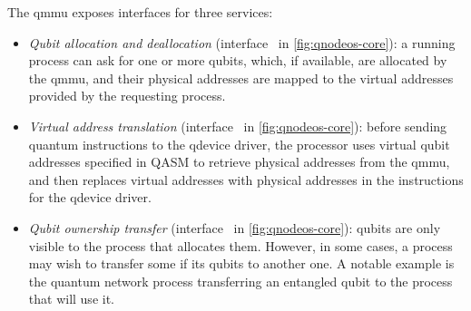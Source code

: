 The \acrshort{qmmu} exposes interfaces for three services:
\begin{itemize}
    \item \emph{Qubit allocation and deallocation} (interface~ in
          \cref{fig:qnodeos-core}): a running process can ask for one or more qubits, which, if
          available, are allocated by the \acrshort{qmmu}, and their physical addresses are mapped
          to the virtual addresses provided by the requesting process.
    \item \emph{Virtual address translation} (interface~ in \cref{fig:qnodeos-core}):
          before sending quantum instructions to the \acrshort{qdevice} driver, the processor uses
          virtual qubit addresses specified in QASM to retrieve physical addresses from the
          \acrshort{qmmu}, and then replaces virtual addresses with physical addresses in the
          instructions for the \acrshort{qdevice} driver.
    \item \emph{Qubit ownership transfer} (interface~ in \cref{fig:qnodeos-core}):
          qubits are only visible to the process that allocates them. However, in some cases, a
          process may wish to transfer some if its qubits to another one. A notable example is the
          quantum network process transferring an entangled qubit to the process that will use it.
\end{itemize}

\begin{xstretch}
\printbibliography[heading=subbibintoc,title={References},notcategory=noprint]
\end{xstretch}
